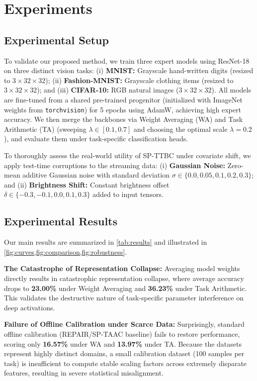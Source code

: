 \documentclass{article}
\theoremstyle{plain}
\theoremstyle{definition}
\theoremstyle{remark}
\begin{document}
\section{Experiments}
\label{experiments}

\subsection{Experimental Setup}
To validate our proposed method, we train three expert models using ResNet-18 on three distinct vision tasks: (i) \textbf{MNIST:} Grayscale hand-written digits (resized to $3 \times 32 \times 32$); (ii) \textbf{Fashion-MNIST:} Grayscale clothing items (resized to $3 \times 32 \times 32$); and (iii) \textbf{CIFAR-10:} RGB natural images ($3 \times 32 \times 32$). All models are fine-tuned from a shared pre-trained progenitor (initialized with ImageNet weights from \texttt{torchvision}) for 5 epochs using AdamW, achieving high expert accuracy. We then merge the backbones via Weight Averaging (WA) and Task Arithmetic (TA) (sweeping $\lambda \in [0.1, 0.7]$ and choosing the optimal scale $\lambda = 0.2$), and evaluate them under task-specific classification heads.

To thoroughly assess the real-world utility of SP-TTBC under covariate shift, we apply test-time corruptions to the streaming data: (i) \textbf{Gaussian Noise:} Zero-mean additive Gaussian noise with standard deviation $\sigma \in \{0.0, 0.05, 0.1, 0.2, 0.3\}$; and (ii) \textbf{Brightness Shift:} Constant brightness offset $\delta \in \{-0.3, -0.1, 0.0, 0.1, 0.3\}$ added to input tensors.

\subsection{Experimental Results}
Our main results are summarized in \cref{tab:results} and illustrated in \cref{fig:curves,fig:comparison,fig:robustness}.

\textbf{The Catastrophe of Representation Collapse:} Averaging model weights directly results in catastrophic representation collapse, where average accuracy drops to \textbf{23.00\%} under Weight Averaging and \textbf{36.23\%} under Task Arithmetic. This validates the destructive nature of task-specific parameter interference on deep activations.

\textbf{Failure of Offline Calibration under Scarce Data:} Surprisingly, standard offline calibration (REPAIR/SP-TAAC baseline) fails to restore performance, scoring only \textbf{16.57\%} under WA and \textbf{13.97\%} under TA. Because the datasets represent highly distinct domains, a small calibration dataset (100 samples per task) is insufficient to compute stable scaling factors across extremely disparate features, resulting in severe statistical misalignment.
\end{document}
